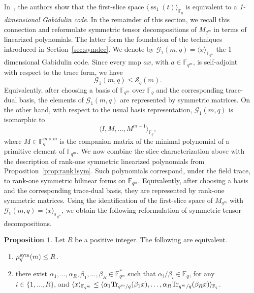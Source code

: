 \documentclass[11pt,a4paper,reqno]{article}
\numberwithin{equation}{section}
\theoremstyle{definition}
\newtheorem{proposition}[theorem]{Proposition}
\newcommand{\numberset}{\mathbb}
\newcommand{\F}{\numberset{F}}
\newcommand{\fq}{\F_q}
\newcommand{\Fq}{\F_q}
\newcommand{\fqm}{\F_{q^m}}
\newcommand{\Tr}{\textnormal{Tr}}
\def\sym{\textup{sym}}
\begin{document}
In~\cite[Proposition~5.13 and Lemma~5.14]{byrne2019tensor}, the authors show that the first-slice space \(\langle \operatorname{ss}_1(t)\rangle_{\mathbb F_q}\) is equivalent to a \textit{1-dimensional
Gabidulin code}. In the remainder of this section, we recall this connection and reformulate symmetric tensor decompositions of \(M_{q^m}\) in terms of linearized polynomials. The latter form the foundation of the techniques introduced in Section~\ref{sec:symdec}. We denote by $\mathcal{G}_1(m,q)=\langle x\rangle_{\mathbb F_{q^m}}$ the 1-dimensional Gabidulin code. Since every map \(a x\), with
\(a\in\mathbb F_{q^m}\), is self-adjoint with respect to the trace form, we have
\[
\mathcal{G}_1(m,q)\leq \mathcal{S}_q(m).
\]
Equivalently, after choosing a basis of \(\mathbb F_{q^m}\) over \(\mathbb F_q\) and the
corresponding trace-dual basis, the elements of \(\mathcal{G}_1(m,q)\) are represented by symmetric
matrices. On the other hand, with respect to the usual basis representation, \(\mathcal{G}_1(m,q)\) is
isomorphic to
\[
\langle I,M,\ldots,M^{m-1}\rangle_{\mathbb F_q},
\]
where \(M\in\mathbb F_q^{m\times m}\) is the companion matrix of the minimal polynomial
of a primitive element of \(\mathbb F_{q^m}\). We now combine the slice characterization above with the description of rank-one
symmetric linearized polynomials from Proposition~\ref{prop:rank1sym}. Such polynomials correspond,
under the field trace, to rank-one symmetric bilinear forms on
\(\mathbb F_{q^m}\). Equivalently, after choosing a basis and the corresponding
trace-dual basis, they are represented by rank-one symmetric matrices. Using the identification of the first-slice space of \(M_{q^m}\) with
\(\mathcal{G}_1(m,q)=\langle x\rangle_{\mathbb F_{q^m}}\), we obtain the following reformulation of
symmetric tensor decompositions.

\begin{proposition}\label{prop:<=Rwithlinpol}
    Let $R$ be a positive integer. The following are equivalent.
    \begin{enumerate}
        \item $\mu_q^\sym(m)\leq R$.
        \item there exist $\alpha_1,\ldots,\alpha_R,\beta_1,\ldots,\beta_R\in\fqm^*$ such that $\alpha_i/\beta_i\in\Fq$, for any $i\in\{1,\ldots,R\}$, and $\langle x\rangle_{\fqm}\leq\langle \alpha_1\Tr_{q^m/q}(\beta_1 x),\ldots, \alpha_R\Tr_{q^m/q}(\beta_R x)\rangle_{\fq}$.
    \end{enumerate}
\end{proposition}
\end{document}

